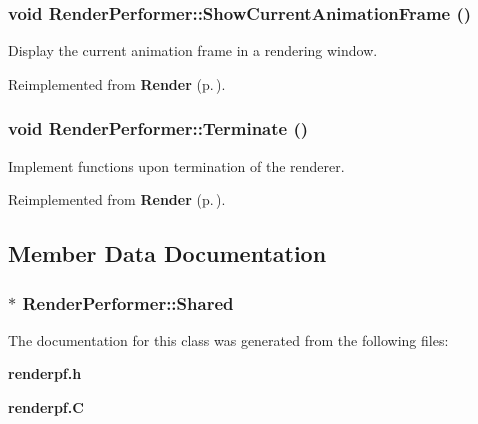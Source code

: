 \subsubsection{\setlength{\rightskip}{0pt plus 5cm}void Render\-Performer::Show\-Current\-Animation\-Frame ()\hspace{0.3cm}{\tt  [protected, virtual]}}\label{classRenderPerformer_b0}


Display the current animation frame in a rendering window.



Reimplemented from {\bf Render} {\rm (p.\,\pageref{classRender_b1})}.
\subsubsection{\setlength{\rightskip}{0pt plus 5cm}void Render\-Performer::Terminate ()\hspace{0.3cm}{\tt  [virtual]}}\label{classRenderPerformer_a6}


Implement functions upon termination of the renderer.



Reimplemented from {\bf Render} {\rm (p.\,\pageref{classRender_a8})}.

\subsection{Member Data Documentation}
\subsubsection{ $\ast$ Render\-Performer::Shared\hspace{0.3cm}{\tt  [static, protected]}}\label{classRenderPerformer_q0}




The documentation for this class was generated from the following files:\begin{CompactItemize}
\item 
{\bf renderpf.h}\item 
{\bf renderpf.C}\end{CompactItemize}
